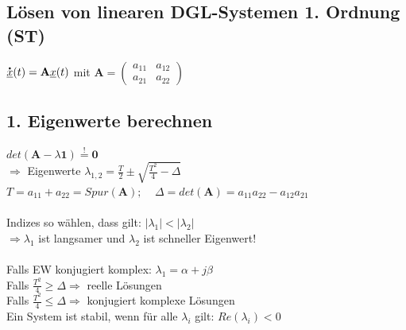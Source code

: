 \documentclass[6pt,a4paper]{scrartcl}
\newcommand{\mustbe}{\stackrel{!}{=}}
\renewcommand*{\dot}[1]{\accentset{\mbox{\textrm{\large\bfseries .}} }{#1}}						%
\begin{document}
\begin{multicols*}{4}
\section{Lösen von linearen DGL-Systemen 1. Ordnung (ST)}
$\dot {\underline{x}}(t)=\textbf{A}\underline{x}(t)$ \quad mit \quad
$\textbf{A} = \begin{pmatrix}
a_{11} & a_{12} \\
a_{21} & a_{22} 
\end{pmatrix}$
\subsection*{1. Eigenwerte berechnen}
$det(\textbf{A}-\lambda \textbf{1})\mustbe \textbf{0}$\\
$\Rightarrow$ Eigenwerte $\lambda_{1,2}=\frac{T}{2}\pm \sqrt{\frac{T^2}{4}-\Delta}$\\
$T=a_{11}+a_{22}=Spur(\textbf{A});\;\;\;\;\Delta =det(\textbf{A})=a_{11}a_{22}-a_{12}a_{21}$\\\\
Indizes so wählen, dass gilt: $|\lambda_1|<|\lambda_2|$\\
$\Rightarrow \lambda_1$ ist langsamer und $\lambda_2$ ist schneller Eigenwert!\\\\
Falls EW konjugiert komplex: $\lambda_1=\alpha +j\beta$\\
Falls $\frac{T^2}{4}\ge \Delta \Rightarrow$ reelle Lösungen\\
Falls $\frac{T^2}{4}\le \Delta \Rightarrow$ konjugiert komplexe Lösungen\\
Ein System ist stabil, wenn für alle $\lambda_i$ gilt: $Re(\lambda_i)<0$

\end{multicols*}
\end{document}
